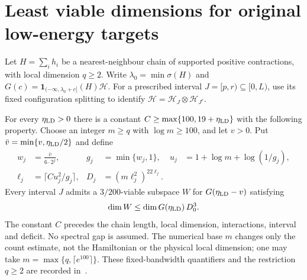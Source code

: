 \section{Least viable dimensions for original low-energy targets}

Let $H=\sum_i h_i$ be a nearest-neighbour chain of supported positive
contractions, with local dimension $q\ge2$. Write
$\lambda_0=\min\sigma(H)$ and
$G(c)=\mathbf1_{(-\infty,\lambda_0+c]}(H)\mathcal H$.
For a prescribed interval $J=[p,r)\subseteq[0,L)$, use its fixed
configuration splitting to identify
$\mathcal H=\mathcal H_J\otimes\mathcal H_{J^c}$.

\begin{theorem}
    \label{thm:physical_low_density_minimum_dimension}
    \leanok
    For every $\eta_{\rm LD}>0$ there is a constant
    $C\ge\max\{100,19+\eta_{\rm LD}\}$ with the following property.
    Choose an integer $m\ge q$ with $\log m\ge100$, and let $v>0$.
    Put $\bar v=\min\{v,\eta_{\rm LD}/2\}$ and define
    \begin{align}
        w_j    & =\frac{\bar v}{6\cdot2^j},      &
        g_j    & =\min\{w_j,1\},                 &
        u_j    & =1+\log m+\log(1/g_j),\nonumber       \\
        \ell_j & =\lceil Cu_j^2/g_j\rceil,       &
        D_j    & =(m\ell_j^2)^{22\ell_j}.        &   &
        \label{eq:ld_minimum_parameters}
    \end{align}
    Every interval $J$ admits a $3/200$-viable subspace $W$ for
    $G(\eta_{\rm LD}-v)$ satisfying
    \begin{align}
        \dim W\le\dim G(\eta_{\rm LD})\,D_0^3.
        \label{eq:ld_minimum_dimension}
    \end{align}
    The constant $C$ precedes the chain length, local dimension,
    interactions, interval and deficit. No spectral gap is assumed.
    The numerical base $m$ changes only the count estimate, not the
    Hamiltonian or the physical local dimension; one may take
    $m=\max\{q,\lceil e^{100}\rceil\}$.
    These fixed-bandwidth quantifiers and the restriction $q\ge2$ are
    recorded in~\cite{gap:alvv16_low_energy_family_scope}.
\end{theorem}

